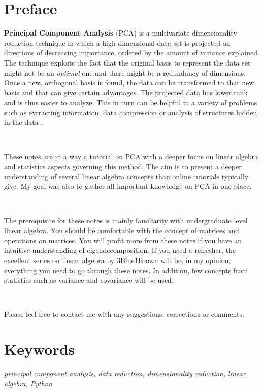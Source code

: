 \documentclass[10pt,twocolumn]{article}
\begin{document}
\section*{Preface}

\textbf{Principal Component Analysis} (PCA) is a multivariate dimensionality reduction technique in which a high-dimensional data set is projected on directions of decreasing importance, ordered by the amount of variance explained. The technique exploits the fact that the original basis to represent the data set might not be an \textit{optimal} one and there might be a redundancy of dimensions. Once a new, orthogonal basis is found, the data can be transformed to that new basis and that can give certain advantages. The projected data has lower rank and is thus easier to analyze. This in turn can be helpful in a variety of problems such as extracting information, data compression or analysis of structures hidden in the data \cite{Abdi_Williams}.

\,\,

These notes are in a way a tutorial on PCA with a deeper focus on linear algebra and statistics aspects governing this method. The aim is to present a deeper understanding of several linear algebra concepts than online tutorials typically give. My goal was also to gather all important knowledge on PCA in one place. 

\,\,

The prerequisite for these notes is mainly familiarity with undergraduate level linear algebra. You should be comfortable with the concept of matrices and operations on matrices. You will profit more from these notes if you have an intuitive understanding of eigendecomposition. If you need a refresher, the excellent series on linear algebra by 3Blue1Brown \cite{3Blue1Brown} will be, in my opinion, everything you need to go through these notes. In addition, few concepts from statistics such as variance and covariance will be used.

\,\,

Please feel free to contact me with any suggestions, corrections or comments.

\section*{Keywords}

\textit{principal component analysis, data reduction, dimensionality reduction, linear algebra, Python}

\tableofcontents
\end{document}
